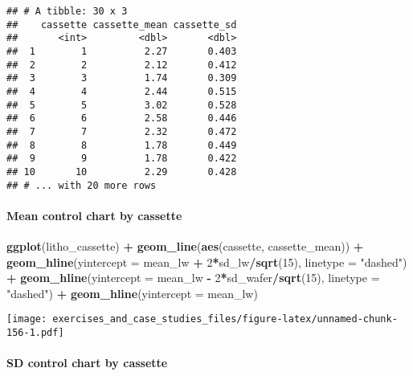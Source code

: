 \documentclass[]{book}
\newenvironment{Shaded}{\begin{snugshade}}{\end{snugshade}}
\newcommand{\DataTypeTok}[1]{\textcolor[rgb]{0.13,0.29,0.53}{#1}}
\newcommand{\DecValTok}[1]{\textcolor[rgb]{0.00,0.00,0.81}{#1}}
\newcommand{\KeywordTok}[1]{\textcolor[rgb]{0.13,0.29,0.53}{\textbf{#1}}}
\newcommand{\NormalTok}[1]{#1}
\newcommand{\OperatorTok}[1]{\textcolor[rgb]{0.81,0.36,0.00}{\textbf{#1}}}
\newcommand{\StringTok}[1]{\textcolor[rgb]{0.31,0.60,0.02}{#1}}
\let\oldparagraph\paragraph
\renewcommand{\paragraph}[1]{\oldparagraph{#1}\mbox{}}
\theoremstyle{definition}
\theoremstyle{definition}
\theoremstyle{definition}
\theoremstyle{remark}
\begin{document}
\begin{verbatim}
## # A tibble: 30 x 3
##    cassette cassette_mean cassette_sd
##       <int>         <dbl>       <dbl>
##  1        1          2.27       0.403
##  2        2          2.12       0.412
##  3        3          1.74       0.309
##  4        4          2.44       0.515
##  5        5          3.02       0.528
##  6        6          2.58       0.446
##  7        7          2.32       0.472
##  8        8          1.78       0.449
##  9        9          1.78       0.422
## 10       10          2.29       0.428
## # ... with 20 more rows
\end{verbatim}

\hypertarget{mean-control-chart-by-cassette}{%
\paragraph{Mean control chart by
cassette}\label{mean-control-chart-by-cassette}}

\begin{Shaded}
\begin{Highlighting}[]
\KeywordTok{ggplot}\NormalTok{(litho_cassette) }\OperatorTok{+}
\StringTok{  }\KeywordTok{geom_line}\NormalTok{(}\KeywordTok{aes}\NormalTok{(cassette, cassette_mean)) }\OperatorTok{+}
\StringTok{  }\KeywordTok{geom_hline}\NormalTok{(}\DataTypeTok{yintercept =}\NormalTok{ mean_lw }\OperatorTok{+}\StringTok{ }\DecValTok{2}\OperatorTok{*}\NormalTok{sd_lw}\OperatorTok{/}\KeywordTok{sqrt}\NormalTok{(}\DecValTok{15}\NormalTok{), }\DataTypeTok{linetype =} \StringTok{"dashed"}\NormalTok{) }\OperatorTok{+}
\StringTok{  }\KeywordTok{geom_hline}\NormalTok{(}\DataTypeTok{yintercept =}\NormalTok{ mean_lw }\OperatorTok{-}\StringTok{ }\DecValTok{2}\OperatorTok{*}\NormalTok{sd_wafer}\OperatorTok{/}\KeywordTok{sqrt}\NormalTok{(}\DecValTok{15}\NormalTok{), }\DataTypeTok{linetype =} \StringTok{"dashed"}\NormalTok{) }\OperatorTok{+}
\StringTok{  }\KeywordTok{geom_hline}\NormalTok{(}\DataTypeTok{yintercept =}\NormalTok{ mean_lw)}
\end{Highlighting}
\end{Shaded}

\texttt{[image: exercises\_and\_case\_studies\_files/figure-latex/unnamed-chunk-156-1.pdf]}

\hypertarget{sd-control-chart-by-cassette}{%
\paragraph{SD control chart by
cassette}\label{sd-control-chart-by-cassette}}
\end{document}
